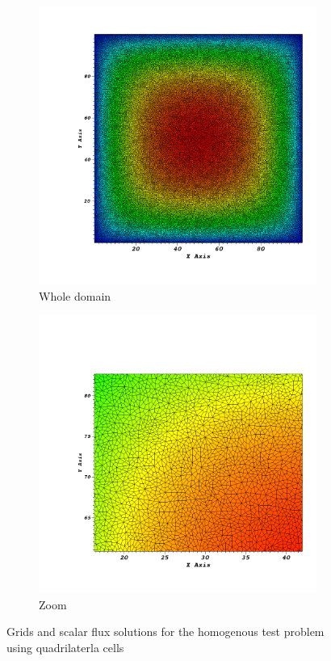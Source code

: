 \begin{figure}[!htbp]
  \centering
  \begin{subfigure}{0.45\textwidth}
    \centering
    \includegraphics[width=\textwidth]{quad_solu0000}
    \caption{Whole domain}
  \end{subfigure}
  \begin{subfigure}{0.45\textwidth}
    \centering
    \includegraphics[width=\textwidth]{quad_solu0001}
    \caption{Zoom}
  \end{subfigure}
  \caption{Grids and scalar flux solutions for the homogenous test problem using quadrilaterla cells}
  \label{homog_test_quads}
\end{figure}

